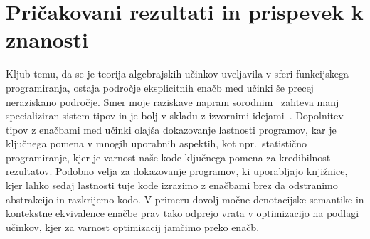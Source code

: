 \documentclass{article}
\begin{document}
\section*{Pričakovani rezultati in prispevek k znanosti}

Kljub temu, da se je teorija algebrajskih učinkov uveljavila v sferi funkcijskega programiranja, ostaja področje eksplicitnih enačb med učinki še precej neraziskano področje. Smer moje raziskave napram sorodnim~\cite{DBLP:journals/pacmpl/Ahman18} zahteva manj specializiran sistem tipov in je bolj v skladu z izvornimi idejami~\cite{DBLP:conf/esop/PlotkinP09}. Dopolnitev tipov z enačbami med učinki olajša dokazovanje lastnosti programov, kar je ključnega pomena v mnogih uporabnih aspektih, kot npr.\ statistično programiranje, kjer je varnost naše kode ključnega pomena za kredibilnost rezultatov. Podobno velja za dokazovanje programov, ki uporabljajo knjižnice, kjer lahko sedaj lastnosti tuje kode izrazimo z enačbami brez da odstranimo abstrakcijo in razkrijemo kodo. V primeru dovolj močne denotacijske semantike in kontekstne ekvivalence enačbe prav tako odprejo vrata v optimizacijo na podlagi učinkov, kjer za varnost optimizacij jamčimo preko enačb.

\renewcommand\refname{Literatura}


\end{document}
